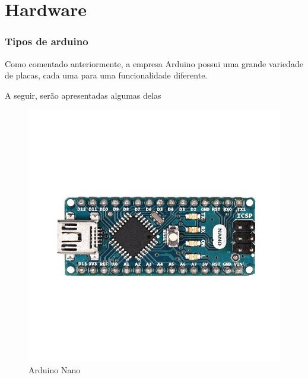 \documentclass[12pt]{beamer}
\begin{document}
\section{Hardware}
\begin{frame}[allowframebreaks]
    \frametitle{Tipos de arduino}

    Como comentado anteriormente, a empresa Arduino possui uma grande variedade de placas,
    cada uma para uma funcionalidade diferente.
    
    A seguir, serão apresentadas algumas delas

    \framebreak%

    \begin{figure}
        \centering
        \includegraphics[height=.68\textheight]{arduino_nano}
        \caption{Arduino Nano}
    \end{figure}


\end{frame}
\end{document}
